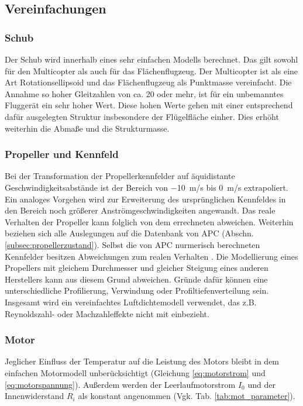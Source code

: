 \subsection{Vereinfachungen}
\subsubsection{Schub}
Der Schub wird innerhalb eines sehr einfachen Modells berechnet. Das gilt sowohl für den Multicopter als auch für das Flächenflugzeug. Der Multicopter ist als eine Art Rotationsellipsoid und das Flächenflugzeug als Punktmasse vereinfacht. Die Annahme so hoher Gleitzahlen von ca. 20 oder mehr, ist für ein unbemanntes Fluggerät ein sehr hoher Wert. Diese hohen Werte gehen mit einer entsprechend dafür ausgelegten Struktur insbesondere der Flügelfläche einher. Dies erhöht weiterhin die Abmaße und die Strukturmasse.

\subsubsection{Propeller und Kennfeld}
Bei der Transformation der Propellerkennfelder auf äquidistante Geschwindigkeitsabstände ist der Bereich von \SI{-10}{m/s} bis \SI{0}{m/s} extrapoliert. Ein analoges Vorgehen wird zur Erweiterung des ursprünglichen Kennfeldes in den Bereich noch größerer Anströmgeschwindigkeiten angewandt. Das reale Verhalten der Propeller kann folglich von dem errechneten abweichen. Weiterhin beziehen sich alle Auslegungen auf die Datenbank von APC (Abschn. \ref{subsec:propellerzustand})\cite{apc}. Selbst die von APC nurmerisch berechneten Kennfelder besitzen Abweichungen zum realen Verhalten \cite{apc.theory}.
Die Modellierung eines Propellers mit gleichem Durchmesser und gleicher Steigung eines anderen Herstellers kann aus diesem Grund abweichen. Gründe dafür können eine unterschiedliche Profilierung, Verwindung oder Profiltiefenverteilung sein. Insgesamt wird ein vereinfachtes Luftdichtemodell verwendet, das z.B. Reynoldszahl- oder Machzahleffekte nicht mit einbezieht.

\subsubsection{Motor}
Jeglicher Einfluss der Temperatur auf die Leistung des Motors bleibt in dem einfachen Motormodell unberücksichtigt (Gleichung \ref{eq:motorstrom} und \ref{eq:motorspannung}). Außerdem werden der Leerlaufmotorstrom \ensuremath{I_{0}} und der Innenwiderstand \ensuremath{R_{i}} als konstant angenommen (Vgk. Tab. \ref{tab:mot_parameter}).

